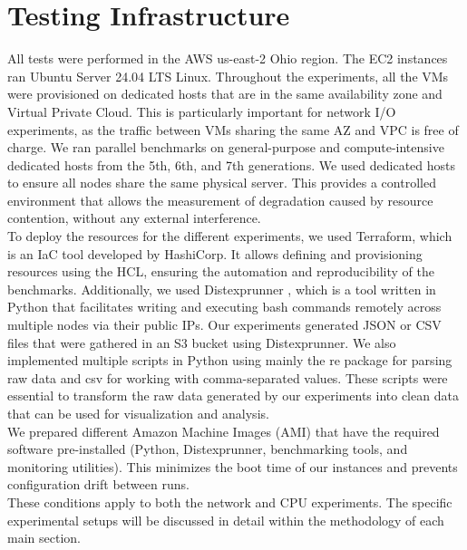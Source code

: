 \chapter{Testing Infrastructure}\label{chapter:infra}
All tests were performed in the \ac{AWS} us-east-2 Ohio region. The EC2 instances ran Ubuntu Server 
24.04 LTS Linux. Throughout the experiments, all the VMs were provisioned on dedicated hosts that 
are in the same availability zone and Virtual Private Cloud. This is particularly important 
for network I/O experiments, as the traffic between VMs sharing the same AZ and VPC is free of 
charge. We ran parallel benchmarks on general-purpose and compute-intensive dedicated hosts from 
the 5th, 6th, and 7th generations. We used dedicated hosts to ensure all nodes share 
the same physical server. This provides a controlled environment that allows the measurement 
of degradation caused by resource contention, without any external interference.\\
To deploy the resources for the different experiments, we used Terraform, which is an \ac{IaC} tool 
developed by HashiCorp. It allows defining and provisioning resources using the \ac{HCL}, 
ensuring the automation and reproducibility of the benchmarks. 
Additionally, we used Distexprunner \cite{distex}, which is a tool written in Python 
that facilitates writing and executing bash commands remotely across multiple nodes via
their public IPs. Our experiments generated JSON or CSV files that were gathered in an S3 
bucket using Distexprunner. We also implemented multiple scripts in Python using mainly the re 
package \cite{re} for parsing raw data and csv \cite{csv} for working with comma-separated values.
These scripts were essential to transform the raw data generated by our experiments into clean data 
that can be used for visualization and analysis. \\
We prepared different Amazon Machine Images (AMI) that have the  required 
software pre-installed (Python, Distexprunner, benchmarking tools, and monitoring utilities).
This minimizes the boot time of our instances and prevents configuration drift between runs. \\
These conditions apply to both the network and CPU experiments. The specific experimental 
setups will be discussed in detail within the methodology of each main section.